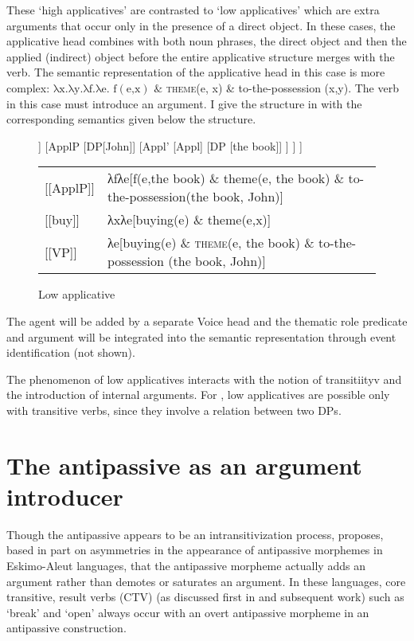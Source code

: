 \documentclass[output=paper,colorlinks,citecolor=brown,nonflat]{./langscibook}
\begin{document}
These ‘high applicatives’ are contrasted to ‘low applicatives’ which are extra arguments that occur only in the presence of a direct object. In these cases, the applicative head combines with both noun phrases, the direct object and then the applied (indirect) object before the entire applicative structure merges with the verb. The semantic representation of the applicative head in this case is more complex:  $\text{λx.λy.λf.λe}\text{. f}\left(\text{e,x}\right)\text{ \&} $  \textsc{theme}(e, x) \& to-the-possession (x,y). The verb in this case must introduce an argument. I give the structure in  with the corresponding semantics given below the structure.


\begin{figure}
	\begin{forest}
		[VP
			[V [buy]] 
			[ApplP 
				[DP[John]]
				[Appl'
					[Appl]
					[DP [the book]]
				]	
			]
		]
	\end{forest}
	
	\begin{tabular}{l p{8cm}}
		{[}{[}ApplP{]}{]}  &  λfλe{[}f(e,the book) \& theme(e, the book) \& to-the-possession(the book, John){]}\\
		{[}{[}buy{]}{]} &  λxλe{[}buying(e) \& theme(e,x){]}\\
		{[}{[}VP{]}{]} &  λe{[}buying(e) \& \textsc{theme}(e, the book) \& to-the-possession (the book, John){]} 
	\end{tabular}
	\caption{\label{fig:basilico:2} Low applicative}
\end{figure}


The agent will be added by a separate Voice head and the thematic role predicate and argument will be integrated into the semantic representation through event identification (not shown).

The phenomenon of low applicatives interacts with the notion of transitiityv and the introduction of internal arguments. For \citet{Pyllkänen2008}, low applicatives are possible only with transitive verbs, since they involve a relation between two DPs.

\section{The antipassive as an argument introducer} %

Though the antipassive appears to be an intransitivization process, \citep{Basilico2012,Basilico2017} proposes, based in part on asymmetries in the appearance of antipassive morphemes in Eskimo-Aleut languages, that the antipassive morpheme actually adds an argument rather than demotes or saturates an argument. In these languages, core transitive, result verbs (CTV) (as discussed first in \citealt{Levin1999, RappaportHovavLevin1999} and subsequent work) such as ‘break’ and ‘open’ always occur with an overt antipassive morpheme in an antipassive construction. 
\end{document}
